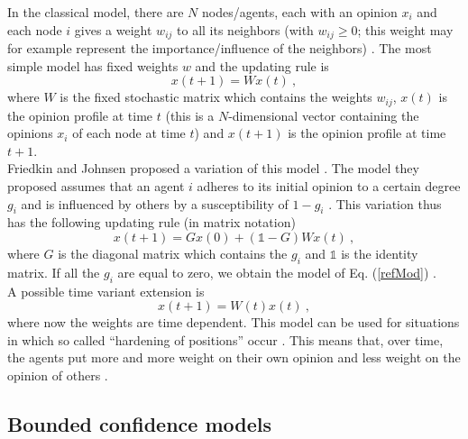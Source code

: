 \documentclass[11 pt , letterpaper , twoside , openright]{book}
\begin{document}
In the classical model, there are $N$ nodes/agents, each with an opinion $x_i$ and each node $i$ gives a weight $w_{ij}$ to all its neighbors (with $w_{ij} \geqslant 0$; this weight may for example represent the importance/influence of the neighbors) \cite{Krause2002}. The most simple model has fixed weights $w$ and the updating rule is \cite{Krause2002}
\begin{equation}\label{refMod}
	x(t+1) = W x(t) \ ,
\end{equation}
where $W$ is the fixed stochastic matrix which contains the weights $w_{ij}$, $x(t)$ is the opinion profile at time $t$ (this is a $N$-dimensional vector containing the opinions $x_i$ of each node at time $t$) and $x(t+1)$ is the opinion profile at time $t+1$.\\
Friedkin and Johnsen proposed a variation of this model \cite{Friedkin1990}\cite{Friedkin1999}. The model they proposed assumes that an agent $i$ adheres to its initial opinion to a certain degree $g_i$ and is influenced by others by a susceptibility of $1-g_i$ \cite{Krause2002}. This variation thus has the following updating rule (in matrix notation) \cite{Krause2002}
\begin{equation}
	x(t+1) = Gx(0) + (\mathbb{1}-G)Wx(t) \ ,
\end{equation}
where $G$ is the diagonal matrix which contains the $g_i$ and $\mathbb{1}$ is the identity matrix. If all the $g_i$ are equal to zero, we obtain the model of Eq. (\ref{refMod}) \cite{Krause2002}.\\
A possible time variant extension is \cite{Krause2002}
\begin{equation}
	x(t+1) = W(t)x(t) \ ,
\end{equation}
where now the weights are time dependent. This model can be used for situations in which so called ``hardening of positions'' occur \cite{Krause2002}. This means that, over time, the agents put more and more weight on their own opinion and less weight on the opinion of others \cite{Krause2002}. 

\subsection{Bounded confidence models}\label{bounded}
\end{document}
